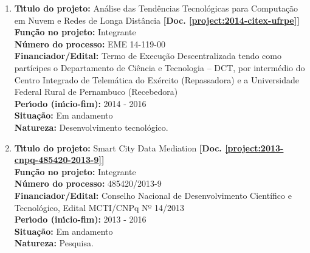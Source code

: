 \documentclass[a4paper,oneside,10pt]{article}
\begin{document}
\begin{enumerate}
\item \textbf{T\'{\i}tulo do projeto:} Análise das Tendências Tecnológicas para Computação em Nuvem e Redes de Longa Distância \textbf{[Doc. \ref{project:2014-citex-ufrpe}]}\\
      \textbf{Fun\c{c}\~{a}o no projeto:} Integrante\\
      \textbf{N\'{u}mero do processo:} EME 14-119-00\\
      \textbf{Financiador/Edital:} Termo de Execução Descentralizada tendo como partícipes o Departamento de Ciência e Tecnologia – DCT, por intermédio do Centro Integrado de Telemática do Exército (Repassadora) e a Universidade Federal Rural de Pernambuco (Recebedora)\\
      \textbf{Per\'{\i}odo (in\'{\i}cio-fim):} 2014 - 2016\\
      \textbf{Situação:} Em andamento \\
      \textbf{Natureza:} Desenvolvimento tecnológico.

\item \textbf{T\'{\i}tulo do projeto:} Smart City Data Mediation \textbf{[Doc. \ref{project:2013-cnpq-485420-2013-9}]}\\
      \textbf{Fun\c{c}\~{a}o no projeto:} Integrante\\
      \textbf{N\'{u}mero do processo:} 485420/2013-9\\
      \textbf{Financiador/Edital:} Conselho Nacional de Desenvolvimento Científico e Tecnológico, Edital MCTI/CNPq Nº 14/2013\\
      \textbf{Per\'{\i}odo (in\'{\i}cio-fim):} 2013 - 2016\\
      \textbf{Situação:} Em andamento \\
      \textbf{Natureza:} Pesquisa.



\end{enumerate}
\end{document}
